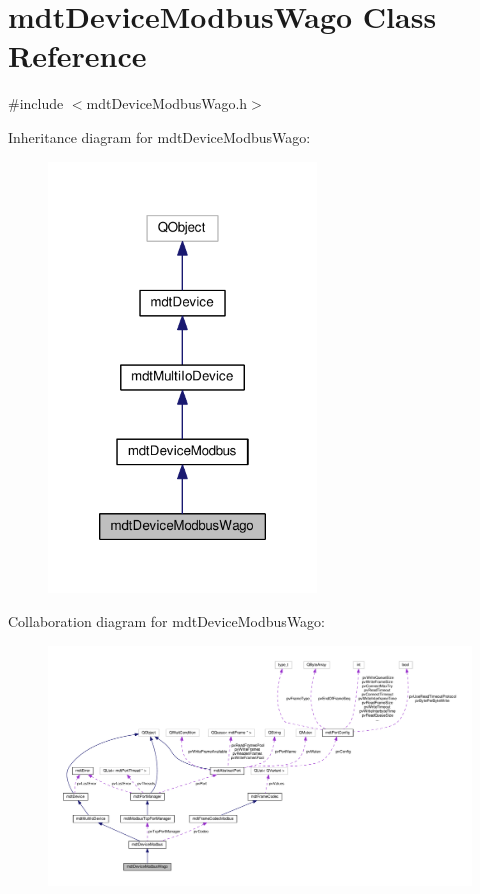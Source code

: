 \hypertarget{classmdt_device_modbus_wago}{\section{mdt\-Device\-Modbus\-Wago Class Reference}
\label{classmdt_device_modbus_wago}
}


{\ttfamily \#include $<$mdt\-Device\-Modbus\-Wago.\-h$>$}



Inheritance diagram for mdt\-Device\-Modbus\-Wago\-:
\nopagebreak
\begin{figure}[H]
\begin{center}
\leavevmode
\includegraphics[width=202pt]{classmdt_device_modbus_wago__inherit__graph}
\end{center}
\end{figure}


Collaboration diagram for mdt\-Device\-Modbus\-Wago\-:
\nopagebreak
\begin{figure}[H]
\begin{center}
\leavevmode
\includegraphics[width=350pt]{classmdt_device_modbus_wago__coll__graph}
\end{center}
\end{figure}
